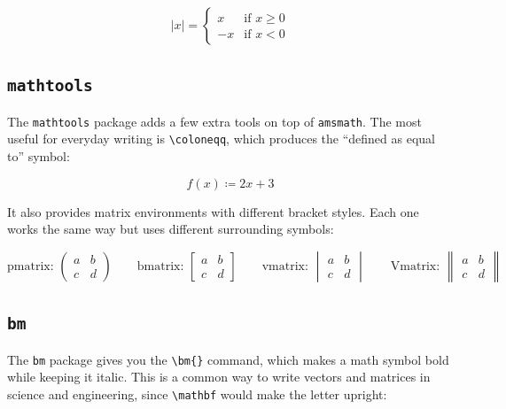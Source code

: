 		\begin{equation}
			|x| = \begin{cases}
				x  & \text{if } x \geq 0 \\
				-x & \text{if } x < 0
			\end{cases}
		\end{equation}
		
	\subsection{\texttt{mathtools}}
	The \texttt{mathtools} package adds a few extra tools on top of \texttt{amsmath}. The most useful for everyday writing is \texttt{\textbackslash coloneqq}, which produces the ``defined as equal to'' symbol:
	
	\begin{equation}
		f(x) \coloneqq 2x + 3
	\end{equation}
	
	It also provides matrix environments with different bracket styles. Each one works the same way but uses different surrounding symbols:
	
	\begin{equation}
		\text{pmatrix: }
		\begin{pmatrix} a & b \\ c & d \end{pmatrix} \qquad
		\text{bmatrix: }
		\begin{bmatrix} a & b \\ c & d \end{bmatrix} \qquad
		\text{vmatrix: }
		\begin{vmatrix} a & b \\ c & d \end{vmatrix} \qquad
		\text{Vmatrix: }
		\begin{Vmatrix} a & b \\ c & d \end{Vmatrix}
	\end{equation}
	
	\subsection{\texttt{bm}}
	The \texttt{bm} package gives you the \texttt{\textbackslash bm\{\}} command, which makes a math symbol bold while keeping it italic. This is a common way to write vectors and matrices in science and engineering, since \texttt{\textbackslash mathbf} would make the letter upright:
	
